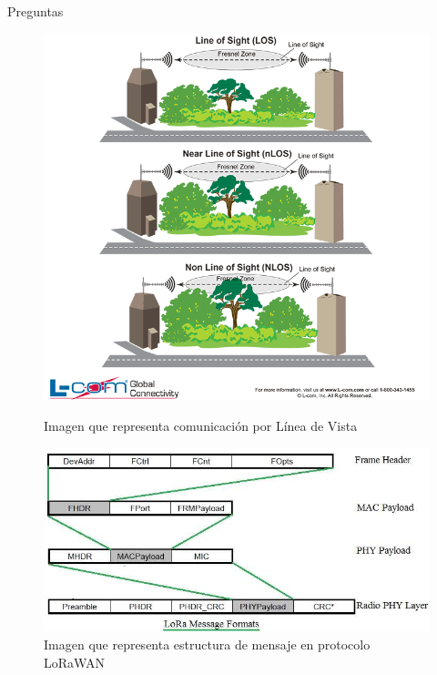 \documentclass[10pt]{beamer}
\begin{document}
\begin{frame}[fragile]{Preguntas}
\begin{figure}
\begin{overprint}
\centering\includegraphics[scale=0.3]{imagenes/los}\caption{Imagen que representa comunicación por Línea de Vista}
\centering\includegraphics[scale=0.4]{imagenes/msg}\caption{Imagen que representa estructura de mensaje en protocolo LoRaWAN}
\end{overprint}
\end{figure}
\end{frame}
\end{document}
